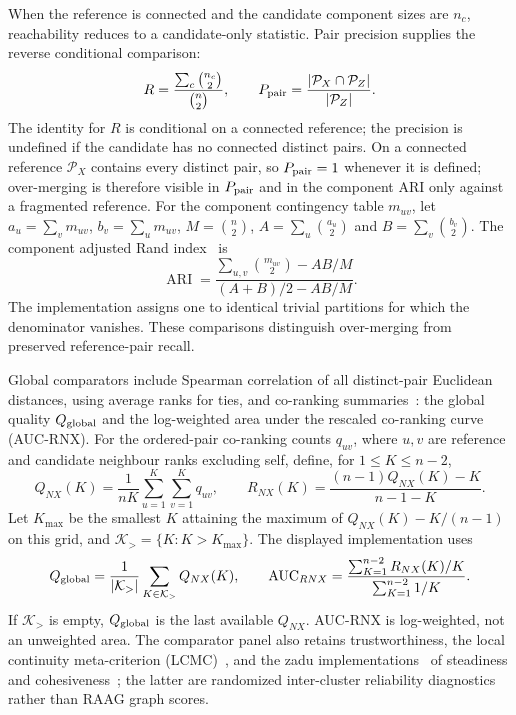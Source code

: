 \documentclass[11pt]{article}
\begin{document}
When the reference is connected and the candidate component sizes are $n_c$, reachability reduces to a candidate-only statistic. Pair precision supplies the reverse conditional comparison:
\begin{equation}
 R=\frac{\sum_c\binom{n_c}{2}}{\binom n2},\qquad
 P_{\rm pair}=\frac{|\mathcal P_X\cap\mathcal P_Z|}{|\mathcal P_Z|}.\label{eq:component-pairs}
\end{equation}
The identity for $R$ is conditional on a connected reference; the precision is undefined if the candidate has no connected distinct pairs. On a connected reference $\mathcal P_X$ contains every distinct pair, so $P_{\rm pair}=1$ whenever it is defined; over-merging is therefore visible in $P_{\rm pair}$ and in the component ARI only against a fragmented reference. For the component contingency table $m_{uv}$, let $a_u=\sum_vm_{uv}$, $b_v=\sum_um_{uv}$, $M=\binom n2$, $A=\sum_u\binom{a_u}{2}$ and $B=\sum_v\binom{b_v}{2}$. The component adjusted Rand index~\cite{hubert1985comparing} is
\begin{equation}
 \operatorname{ARI}=\frac{\sum_{u,v}\binom{m_{uv}}{2}-AB/M}{(A+B)/2-AB/M}.
\end{equation}
The implementation assigns one to identical trivial partitions for which the denominator vanishes. These comparisons distinguish over-merging from preserved reference-pair recall.

Global comparators include Spearman correlation of all distinct-pair Euclidean distances, using average ranks for ties, and co-ranking summaries~\cite{lee2009quality}: the global quality $Q_{\rm global}$ and the log-weighted area under the rescaled co-ranking curve (AUC-RNX). For the ordered-pair co-ranking counts $q_{uv}$, where $u,v$ are reference and candidate neighbour ranks excluding self, define, for $1\leq K\leq n-2$,
\begin{equation}
 Q_{NX}(K)=\frac{1}{nK}\sum_{u=1}^K\sum_{v=1}^Kq_{uv},\qquad
 R_{NX}(K)=\frac{(n-1)Q_{NX}(K)-K}{n-1-K}.
\end{equation}
Let $K_{\max}$ be the smallest $K$ attaining the maximum of $Q_{NX}(K)-K/(n-1)$ on this grid, and $\mathcal K_>=\{K:K>K_{\max}\}$. The displayed implementation uses
\begin{equation}
 Q_{\rm global}=\frac{1}{|\mathcal K_>|}\sum_{K\in\mathcal K_>}Q_{NX}(K),\qquad
 \operatorname{AUC}_{RNX}=\frac{\sum_{K=1}^{n-2}R_{NX}(K)/K}{\sum_{K=1}^{n-2}1/K}.
\end{equation}
If $\mathcal K_>$ is empty, $Q_{\rm global}$ is the last available $Q_{NX}$. AUC-RNX is log-weighted, not an unweighted area. The comparator panel also retains trustworthiness, the local continuity meta-criterion (LCMC)~\cite{chen2009local}, and the zadu implementations~\cite{jeon2023zadu} of steadiness and cohesiveness~\cite{jeon2022steadiness}; the latter are randomized inter-cluster reliability diagnostics rather than RAAG graph scores.
\end{document}
